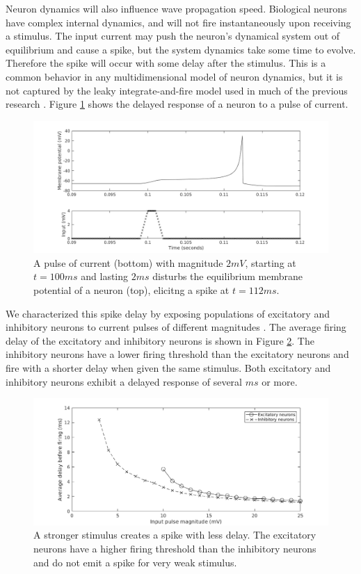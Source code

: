 \documentclass[a4paper,11pt]{article}
\begin{document}
Neuron dynamics will also influence wave propagation speed.
Biological neurons have complex internal dynamics, and will not fire instantaneously upon receiving a stimulus.
The input current may push the neuron's dynamical system out of equilibrium and cause a spike, but the system dynamics take some time to evolve.
Therefore the spike will occur with some delay after the stimulus.
This is a common behavior in any multidimensional model of neuron dynamics, but it is not captured by the leaky integrate-and-fire model used in much of the previous research \cite{keane2015}\cite{senk2020}.
Figure \ref{fig:delay_neuronstep} shows the delayed response of a neuron to a pulse of current.
\begin{figure}[!htb]
 \caption{ A pulse of current (bottom) with magnitude $2 mV$, starting at $t=100 ms$ and lasting $2 ms$ disturbs the equilibrium membrane potential of a neuron (top), elicitng a spike at $t=112 ms$. }
 \label{fig:delay_neuronstep}
 \centering
   \includegraphics[width=\textwidth]{fig/WaveSpeed_NeuronStepTest}
\end{figure}

We characterized this spike delay by exposing populations of excitatory and inhibitory neurons to current pulses of different magnitudes \cite{izhikevich}.
The average firing delay of the excitatory and inhibitory neurons is shown in Figure \ref{fig:delay_neurondynamics}.
The inhibitory neurons have a lower firing threshold than the excitatory neurons \cite{izhikevich2003} and fire with a shorter delay when given the same stimulus.
Both excitatory and inhibitory neurons exhibit a delayed response of several $ms$ or more.
\begin{figure}[!htb]
 \caption{ A stronger stimulus creates a spike with less delay. The excitatory neurons have a higher firing threshold than the inhibitory neurons and do not emit a spike for very weak stimulus.}
 \label{fig:delay_neurondynamics}
 \centering
   \includegraphics[width=\textwidth]{fig/WaveSpeed_NeuronDynamics}
\end{figure}
\end{document}

